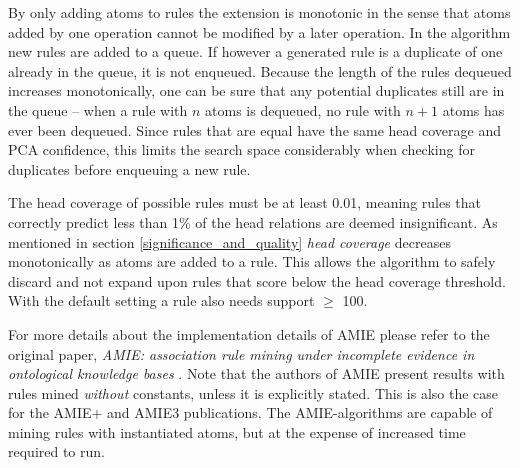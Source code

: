 By only adding atoms to rules the extension is monotonic in the sense that atoms added by one operation cannot be modified by a later operation. In the algorithm new rules are added to a queue. If however a generated rule is a duplicate of one already in the queue, it is not enqueued. Because the length of the rules dequeued increases monotonically, one can be sure that any potential duplicates still are in the queue -- when a rule with $n$ atoms is dequeued, no rule with $n+1$ atoms has ever been dequeued. Since rules that are equal have the same head coverage and PCA confidence, this limits the search space considerably when checking for duplicates before enqueuing a new rule.

The head coverage of possible rules must be at least 0.01, meaning rules that correctly predict less than 1\% of the head relations are deemed insignificant. As mentioned in section \ref{significance_and_quality} \textit{head coverage} decreases monotonically as atoms are added to a rule. This allows the algorithm to safely discard and not expand upon rules that score below the head coverage threshold. With the default setting a rule also needs support $\geq$ 100. %

For more details about the implementation details of AMIE please refer to the original paper, \textit{AMIE: association rule mining under incomplete evidence in ontological knowledge bases} \cite{amie_plus}. Note that the authors of AMIE present results with rules mined \textit{without} constants, unless it is explicitly stated. This is also the case for the AMIE+ and AMIE3 publications. The AMIE-algorithms are capable of mining rules with instantiated atoms, but at the expense of increased time required to run.

